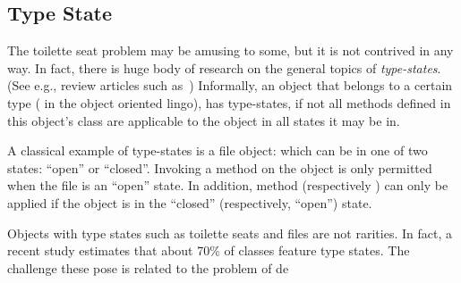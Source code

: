 \subsection{Type State}
The toilette seat problem may be amusing to some, but it is not contrived in any way.
In fact, there is huge body of research on the general topics of 
	\emph{type-states}. (See e.g., review articles such as~\cite{Tom:Jerry:2001,Ben:Jerry:1934})
Informally, an object that belongs to a certain type ( in the 
object oriented lingo), has type-states, if not all methods defined in this object's class are applicable to the object in all states it may be in.

A classical example of type-states is a file object: which can be in one of two states:
``open'' or ``closed''. Invoking a  method on the object is only permitted when the file is an ``open'' state.
In addition, method  (respectively ) can only be applied if the object is in the ``closed'' (respectively, ``open'') state.

Objects with type states such as toilette seats and files are not rarities.
In fact, a recent study estimates that about 70\% of \Java classes feature type states.
The challenge these pose is related to the problem of de


